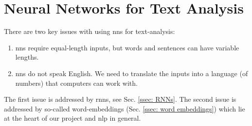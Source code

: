 \section{Neural Networks for Text Analysis \label{sec: NNs for text}}
    There are two key issues with using \glspl{nn} for text-analysis:
    
    \begin{enumerate}
    \item \glspl{nn} require equal-length inputs, but words and sentences can have variable lengths.
    \item \glspl{nn} do not speak English. We need to translate the inputs into a language (of numbers) that computers can work with. 
    
    \end{enumerate}
    The first issue is addressed by \glspl{rnn}, see Sec. \ref{ssec: RNNs}.
    The second issue is addressed by so-called word-\glspl{embedding} (Sec. \ref{ssec: word embeddings}) which lie at the heart of our project and \gls{nlp} in general.
